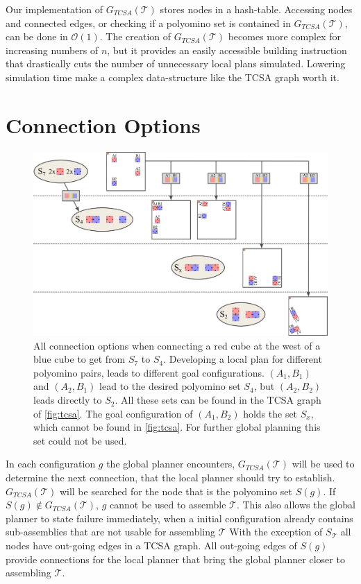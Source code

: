 Our implementation of $G_{\textit{TCSA}}(\mathcal{T})$ stores nodes in a hash-table.
Accessing nodes and connected edges, or checking if a polyomino set is contained in $G_{\textit{TCSA}}(\mathcal{T})$, can be done in  $\mathcal{O}(1)$.
The creation of $G_{\textit{TCSA}}(\mathcal{T})$ becomes more complex for increasing numbers of $n$, but it provides an easily accessible building instruction that drastically cuts the number of unnecessary local plans simulated.
Lowering simulation time make a complex data-structure like the TCSA graph worth it.


\section{Connection Options}
\label{sec:connect_options}

\begin{figure}
	\centering
	\includegraphics[width=1\textwidth]{figures/connect_options.pdf}
	\caption[Example of connection options for one two-cut-sub-assembly edge]{All connection options when connecting a red cube at the west of a blue cube to get from $S_7$ to $S_4$. Developing a local plan for different polyomino pairs, leads to different goal configurations. $(A_1,B_1)$ and $(A_2,B_1)$ lead to the desired polyomino set $S_4$, but $(A_2,B_2)$ leads directly to $S_2$. All these sets can be found in the TCSA graph of \autoref{fig:tcsa}. The goal configuration of $(A_1, B_2)$ holds the set $S_x$, which cannot be found in \autoref{fig:tcsa}. For further global planning this set could not be used.}
	\label{fig:connect_options}
\end{figure}

In each configuration $g$ the global planner encounters, $G_{\textit{TCSA}}(\mathcal{T})$ will be used to determine the next connection, that the local planner should try to establish.
$G_{\textit{TCSA}}(\mathcal{T})$ will be searched for the node that is the polyomino set $S(g)$.
If $S(g) \notin G_{\textit{TCSA}}(\mathcal{T})$, $g$ cannot be used to assemble $\mathcal{T}$.
This also allows the global planner to state failure immediately, when a initial configuration already contains sub-assemblies that are not usable for assembling $\mathcal{T}$  
With the exception of $S_\mathcal{T}$ all nodes have out-going edges in a TCSA graph.
All out-going edges of $S(g)$ provide connections for the local planner that bring the global planner closer to assembling $\mathcal{T}$.

